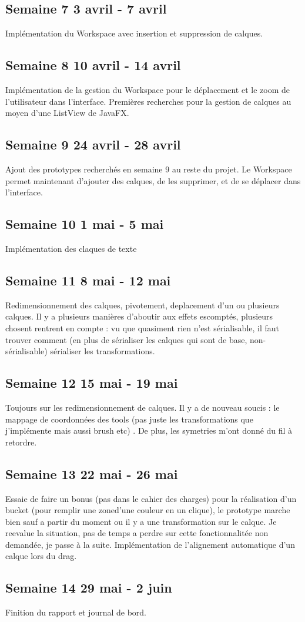 \subsection{Semaine 7 3 avril - 7 avril}
Implémentation du Workspace avec insertion et suppression de calques.
\subsection{Semaine 8 10 avril - 14 avril}
Implémentation de la gestion du Workspace pour le déplacement et le zoom de l'utilisateur dans l'interface. Premières recherches pour la gestion de calques au moyen d'une ListView de JavaFX.
\subsection{Semaine 9 24 avril - 28 avril}
Ajout des prototypes recherchés en semaine 9 au reste du projet. Le Workspace permet maintenant d'ajouter des calques, de les supprimer, et de se déplacer dans l'interface. 
\subsection{Semaine 10 1 mai - 5 mai}
Implémentation des claques de texte
\subsection{Semaine 11 8 mai - 12 mai} 
Redimensionnement des calques, pivotement, deplacement d'un ou plusieurs calques. Il y a plusieurs manières d'aboutir aux effets escomptés, plusieurs chosent rentrent en compte : vu que quasiment rien n'est sérialisable, il faut trouver comment (en plus de sérialiser les calques qui sont de base, non-sérialisable) sérialiser les transformations.
\subsection{Semaine 12 15 mai - 19 mai}
Toujours sur les redimensionnement de calques. Il y a de nouveau soucis : le mappage de coordonnées des tools (pas juste les transformations que j'implémente mais aussi brush etc) . De plus, les symetries m'ont donné du fil à retordre.
\subsection{Semaine 13 22 mai - 26 mai}
Essaie de faire un bonus (pas dans le cahier des charges) pour la réalisation d'un bucket (pour remplir une zoned'une couleur en un clique), le prototype marche bien sauf a partir du moment ou il y a une transformation sur le calque. Je reevalue la situation, pas de temps a perdre sur cette fonctionnalitée non demandée, je passe à la suite. Implémentation de l'alignement automatique d'un calque lors du drag.
\subsection{Semaine 14 29 mai - 2 juin}
Finition du rapport et journal de bord.



